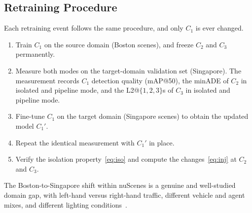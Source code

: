 \documentclass[conference]{IEEEtran}
\begin{document}
\subsection{Retraining Procedure}
\label{sec:experiment}
Each retraining event follows the same procedure, and only $C_1$ is ever changed.
\begin{enumerate}
\item Train $C_1$ on the source domain (Boston scenes), and freeze $C_2$ and $C_3$
permanently.
\item Measure both modes on the target-domain validation set (Singapore). The
measurement records $C_1$ detection quality (mAP@50), the minADE of $C_2$ in isolated
and pipeline mode, and the L2@$\{1,2,3\}$s of $C_3$ in isolated and pipeline mode.
\item Fine-tune $C_1$ on the target domain (Singapore scenes) to obtain the
updated model $C_1'$.
\item Repeat the identical measurement with $C_1'$ in place.
\item Verify the isolation property~\eqref{eq:iso} and compute the
changes~\eqref{eq:inj} at $C_2$ and $C_3$.
\end{enumerate}
The Boston-to-Singapore shift within nuScenes is a genuine and well-studied domain
gap, with left-hand versus right-hand traffic, different vehicle and agent mixes,
and different lighting conditions~\cite{caesar2020nuscenes}.
\end{document}
